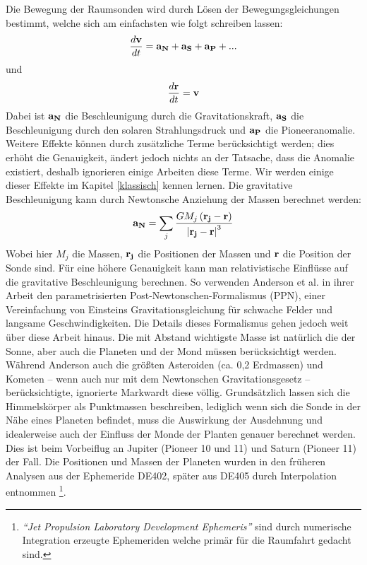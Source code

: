 Die Bewegung der Raumsonden wird durch Lösen der Bewegungsgleichungen bestimmt, welche sich am einfachsten wie folgt schreiben lassen:
\begin{equation}
\frac{d{\bf v}}{dt}={\bf a_N} + {\bf a_S} + {\bf a_P} + ...
\end{equation}
und
\begin{equation}
\frac{d{\bf r}}{dt}={\bf v}
\end{equation}
Dabei ist $\bf a_N$ die Beschleunigung durch die Gravitationskraft, $\bf a_S$ die Beschleunigung durch den solaren Strahlungsdruck und $\bf a_P$ die Pioneeranomalie. Weitere Effekte können durch zusätzliche Terme berücksichtigt werden; dies erhöht die Genauigkeit, ändert jedoch nichts an der Tatsache, dass die Anomalie existiert, deshalb ignorieren einige Arbeiten diese Terme. Wir werden einige dieser Effekte im Kapitel \ref{klassisch} kennen lernen.
Die gravitative Beschleunigung kann durch Newtonsche Anziehung der Massen berechnet werden:
\begin{equation}
{\bf a_N} = \sum_j \frac{GM_j\left({\bf r_j}-{\bf r}\right)}{\left| {\bf r_j}-{\bf r} \right|^3}
\end{equation}
Wobei hier $M_j$ die Massen, $\bf r_j$ die Positionen der Massen und $\bf r$ die Position der Sonde sind.
Für eine höhere Genauigkeit kann man relativistische Einflüsse auf die gravitative Beschleunigung berechnen. So verwenden Anderson et al. in ihrer Arbeit den parametrisierten Post-Newtonschen-Formalismus (PPN), einer Vereinfachung von Einsteins Gravitationsgleichung für schwache Felder und langsame Geschwindigkeiten.
Die Details dieses Formalismus gehen jedoch weit über diese Arbeit hinaus.
Die mit Abstand wichtigste Masse ist natürlich die der Sonne, aber auch die Planeten und der Mond müssen berücksichtigt werden.
Während Anderson\cite{Anderson2002} auch die größten Asteroiden (ca. 0,2 Erdmassen) und Kometen – wenn auch nur mit dem Newtonschen Gravitationsgesetz – berücksichtigte, ignorierte Markwardt diese völlig.
Grundsätzlich lassen sich die Himmelskörper als Punktmassen beschreiben, lediglich wenn sich die Sonde in der Nähe eines Planeten befindet, muss die Auswirkung der Ausdehnung und idealerweise auch der Einfluss der Monde der Planten genauer berechnet werden. Dies ist beim Vorbeiflug an Jupiter (Pioneer 10 und 11) und Saturn (Pioneer 11) der Fall.
Die Positionen und Massen der Planeten wurden in den früheren Analysen aus der Ephemeride
DE402, später aus DE405 durch Interpolation entnommen
\footnote{\textit{``Jet Propulsion Laboratory Development Ephemeris''} sind durch
numerische Integration erzeugte Ephemeriden welche primär für die Raumfahrt gedacht sind.}\cite{Anderson2002}.

